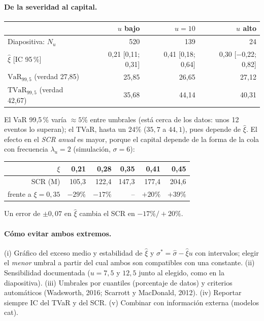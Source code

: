 \documentclass[a4paper,12pt]{article}
\newcommand{\euro}{\texteuro}
\newcommand{\VaR}{\mathrm{VaR}}
\newcommand{\TVaR}{\mathrm{TVaR}}
\begin{document}
\paragraph{De la severidad al capital.}
\begin{center}
\small
\begin{tabular}{lrrr}
\toprule
 & $u$ bajo & $u=10$ & $u$ alto\\
\midrule
Diapositiva: $N_u$ & 520 & 139 & 24\\
$\hat\xi$ [IC 95\,\%] & 0,21 [0,11; 0,31] & 0,41 [0,18; 0,64] & 0,30 [$-$0,22; 0,82]\\
$\VaR_{99,5}$ (verdad 27,85) & 25,85 & 26,65 & 27,12\\
$\TVaR_{99,5}$ (verdad 42,67) & 35,68 & 44,14 & 40,31\\
\bottomrule
\end{tabular}
\end{center}
El VaR 99,5\,\% var\'ia $\approx5\%$ entre umbrales (est\'a cerca de los datos: unos 12 eventos lo superan); el TVaR, hasta un $24\%$ ($35{,}7$ a $44{,}1$), pues depende de $\hat\xi$. El efecto en el \emph{SCR anual} es mayor, porque el capital depende de la forma de la cola con frecuencia $\lambda_u=2$ (simulaci\'on, $\sigma=6$):
\begin{center}
\small
\begin{tabular}{rrrrrr}
\toprule
$\xi$ & 0,21 & 0,28 & 0,35 & 0,41 & 0,45\\
\midrule
SCR (M\euro) & 105,3 & 122,4 & 147,3 & 177,4 & 204,6\\
frente a $\xi=0{,}35$ & $-29\%$ & $-17\%$ & -- & $+20\%$ & $+39\%$\\
\bottomrule
\end{tabular}
\end{center}
Un error de $\pm0{,}07$ en $\hat\xi$ cambia el SCR en $-17\%/+20\%$.

\paragraph{C\'omo evitar ambos extremos.} (i) Gr\'afico del exceso medio y estabilidad de $\hat\xi$ y $\sigma^*=\hat\sigma-\hat\xi u$ con intervalos; elegir el \emph{menor} umbral a partir del cual ambos son compatibles con una constante. (ii) Sensibilidad documentada ($u=7{,}5$ y $12{,}5$ junto al elegido, como en la diapositiva). (iii) Umbrales por cuantiles (porcentaje de datos) y criterios autom\'aticos (Wadsworth, 2016; Scarrott y MacDonald, 2012). (iv) Reportar siempre IC del TVaR y del SCR. (v) Combinar con informaci\'on externa (modelos cat).
\end{document}
